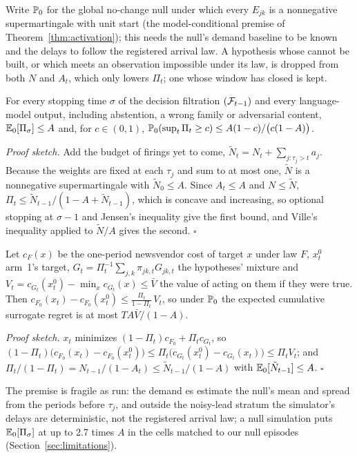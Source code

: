 Write $\mathbb{P}_0$ for the global no-change null under which every $E_{jk}$ is a
nonnegative supermartingale with unit start (the model-conditional premise of
Theorem~\ref{thm:activation}); this needs the null's demand baseline to be known
and the delays to follow the registered arrival law. A hypothesis whose
\eprocess{} cannot be built, or which meets an observation impossible under its
law, is dropped from both $N$ and $A_t$, which only lowers $\Pi_t$; one whose
window has closed is kept.

\begin{theorem}[Exposure]
\label{thm:exposure}
For every stopping time $\sigma$ of the decision filtration $(\mathcal{F}_{t-1})$ and
every language-model output, including abstention, a wrong family or adversarial
content, $\mathbb{E}_0[\Pi_\sigma] \le A$ and, for $c\in(0,1)$,
$\mathbb{P}_0(\sup_t \Pi_t \ge c) \le A(1-c)/\bigl(c(1-A)\bigr)$.
\end{theorem}

\emph{Proof sketch.} Add the budget of firings yet to come,
$\tilde N_t = N_t + \sum_{j:\tau_j > t} a_j$. Because the weights are fixed at
each $\tau_j$ and sum to at most one, $\tilde N$ is a nonnegative supermartingale
with $\tilde N_0 \le A$. Since $A_t \le A$ and $N \le \tilde N$,
$\Pi_t \le \tilde N_{t-1}/(1-A+\tilde N_{t-1})$, which is concave and increasing, so
optional stopping at $\sigma-1$ and Jensen's inequality give the first bound, and
Ville's inequality applied to $\tilde N/A$ gives the second. \hfill$\square$

\begin{theorem}
\label{thm:regret}
Let $c_F(x)$ be the one-period newsvendor cost of target $x$ under law $F$, $x^0_t$
arm~1's target, $G_t = \Pi_t^{-1}\sum_{j,k}\pi_{jk,t}G_{jk,t}$ the hypotheses'
mixture and $V_t = c_{G_t}(x^0_t) - \min_x c_{G_t}(x) \le \bar V$ the value of acting
on them if they were true. Then
$c_{F_0}(x_t) - c_{F_0}(x^0_t) \le \frac{\Pi_t}{1-\Pi_t}\,V_t$, so under
$\mathbb{P}_0$ the expected cumulative surrogate regret is at most
$T A \bar V/(1-A)$.
\end{theorem}

\emph{Proof sketch.} $x_t$ minimizes $(1-\Pi_t)c_{F_0} + \Pi_t c_{G_t}$, so
$(1-\Pi_t)\bigl(c_{F_0}(x_t)-c_{F_0}(x^0_t)\bigr) \le
\Pi_t\bigl(c_{G_t}(x^0_t)-c_{G_t}(x_t)\bigr) \le \Pi_t V_t$; and
$\Pi_t/(1-\Pi_t) = N_{t-1}/(1-A_t) \le \tilde N_{t-1}/(1-A)$ with
$\mathbb{E}_0[\tilde N_{t-1}] \le A$. \hfill$\square$

The premise is fragile as run: the demand \eprocess{}es estimate the null's mean and spread
from the periods before $\tau_j$, and outside the noisy-lead stratum the simulator's delays are
deterministic, not the registered arrival law; a null simulation puts
$\mathbb{E}_0[\Pi_\sigma]$ at up to 2.7 times $A$ in the cells matched to our null episodes
(Section~\ref{sec:limitations}).


